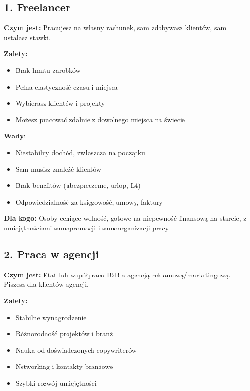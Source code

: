 \documentclass[
  12pt,
  a4paper,
  twoside,
  openright,
  12pt,
  DIV=12,
  BCOR=12mm]{scrbook}
\providecommand{\tightlist}{%
  \setlength{\itemsep}{0pt}\setlength{\parskip}{0pt}}\usepackage{longtable,booktabs,array}
\begin{document}
\subsection{1. Freelancer}\label{freelancer}

\textbf{Czym jest:} Pracujesz na własny rachunek, sam zdobywasz
klientów, sam ustalasz stawki.

\textbf{Zalety:}

\begin{itemize}
\tightlist
\item
  Brak limitu zarobków
\item
  Pełna elastyczność czasu i miejsca
\item
  Wybierasz klientów i projekty
\item
  Możesz pracować zdalnie z dowolnego miejsca na świecie
\end{itemize}

\textbf{Wady:}

\begin{itemize}
\tightlist
\item
  Niestabilny dochód, zwłaszcza na początku
\item
  Sam musisz znaleźć klientów
\item
  Brak benefitów (ubezpieczenie, urlop, L4)
\item
  Odpowiedzialność za księgowość, umowy, faktury
\end{itemize}

\textbf{Dla kogo:} Osoby ceniące wolność, gotowe na niepewność finansową
na starcie, z umiejętnościami samopromocji i samoorganizacji pracy.

\subsection{2. Praca w agencji}\label{praca-w-agencji}

\textbf{Czym jest:} Etat lub współpraca B2B z agencją
reklamową/marketingową. Piszesz dla klientów agencji.

\textbf{Zalety:}

\begin{itemize}
\tightlist
\item
  Stabilne wynagrodzenie
\item
  Różnorodność projektów i branż
\item
  Nauka od doświadczonych copywriterów
\item
  Networking i kontakty branżowe
\item
  Szybki rozwój umiejętności
\end{itemize}
\end{document}
